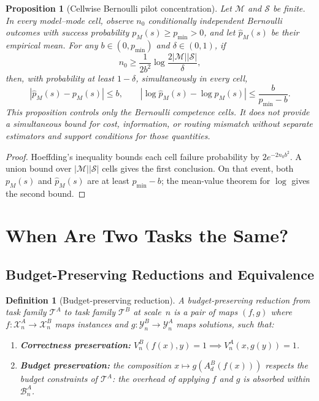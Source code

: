 \documentclass[10pt]{article}
\theoremstyle{paperplain}
\newtheorem{proposition}[theorem]{Proposition}
\theoremstyle{paperdefinition}
\newtheorem{definition}[theorem]{Definition}
\theoremstyle{paperremark}
\newcommand{\cX}{\mathcal{X}}
\newcommand{\cY}{\mathcal{Y}}
\newcommand{\cT}{\mathcal{T}}
\newcommand{\cB}{\mathcal{B}}
\begin{document}
\begin{proposition}[Cellwise Bernoulli pilot concentration]
\label{prop:cellwise-pilot-concentration}
Let \(\mathcal M\) and \(\mathcal S\) be finite.  In every model--mode cell,
observe \(n_0\) conditionally independent Bernoulli outcomes with success
probability \(p_M(s)\ge p_{\min}>0\), and let \(\widehat p_M(s)\) be their
empirical mean.  For any \(b\in(0,p_{\min})\) and \(\delta\in(0,1)\), if
\[
n_0\ge
\frac{1}{2b^2}\log\frac{2|\mathcal M||\mathcal S|}{\delta},
\]
then, with probability at least \(1-\delta\), simultaneously in every cell,
\[
|\widehat p_M(s)-p_M(s)|\le b,
\qquad
|\log\widehat p_M(s)-\log p_M(s)|
\le \frac{b}{p_{\min}-b}.
\]
This proposition controls only the Bernoulli competence cells.  It does not
provide a simultaneous bound for cost, information, or routing mismatch
without separate estimators and support conditions for those quantities.
\end{proposition}

\begin{proof}
Hoeffding's inequality bounds each cell failure probability by
\(2e^{-2n_0b^2}\).  A union bound over
\(|\mathcal M||\mathcal S|\) cells gives the first conclusion.  On that event,
both \(p_M(s)\) and \(\widehat p_M(s)\) are at least
\(p_{\min}-b\); the mean-value theorem for \(\log\) gives the second bound.
\end{proof}

\section{When Are Two Tasks the Same?}
\label{sec:equivalence}

\subsection{Budget-Preserving Reductions and Equivalence}
\label{subsec:task-equiv-def}

\begin{definition}[Budget-preserving reduction]
\label{def:budget-preserving-reduction}
A \emph{budget-preserving reduction} from task family $\cT^A$ to task family $\cT^B$ at scale~$n$ is a pair of maps $(f,g)$ where $f: \cX^A_n \to \cX^B_n$ maps instances and $g: \cY^B_n \to \cY^A_n$ maps solutions, such that:
\begin{enumerate}
\item \textbf{Correctness preservation:} $V^B_n(f(x), y) = 1 \implies V^A_n(x, g(y)) = 1$.
\item \textbf{Budget preservation:} the composition $x \mapsto g(A_d^B(f(x)))$ respects the budget constraints of $\cT^A$: the overhead of applying $f$ and $g$ is absorbed within $\cB^A_n$.
\end{enumerate}
\end{definition}
\end{document}
